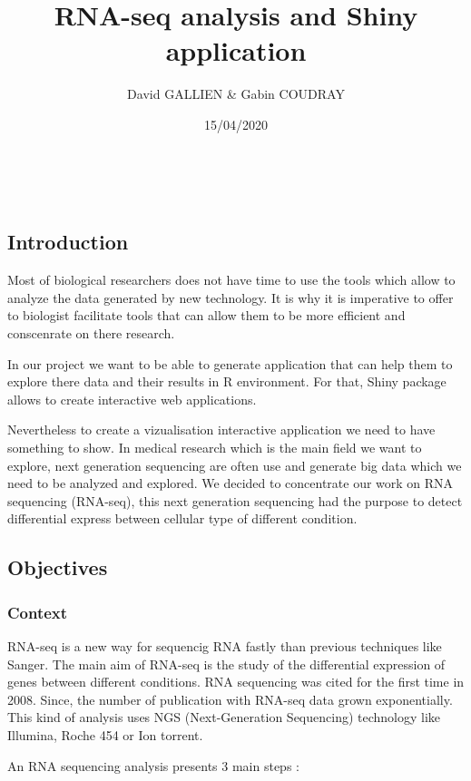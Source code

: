 \documentclass[]{article}
\title{RNA-seq analysis and Shiny application}
\author{David GALLIEN \& Gabin COUDRAY}
\date{15/04/2020}
\begin{document}
\maketitle

~

\subsection{Introduction}\label{introduction}

Most of biological researchers does not have time to use the tools which
allow to analyze the data generated by new technology. It is why it is
imperative to offer to biologist facilitate tools that can allow them to
be more efficient and conscenrate on there research.

In our project we want to be able to generate application that can help
them to explore there data and their results in R environment. For that,
Shiny package allows to create interactive web applications.

Nevertheless to create a vizualisation interactive application we need
to have something to show. In medical research which is the main field
we want to explore, next generation sequencing are often use and
generate big data which we need to be analyzed and explored. We decided
to concentrate our work on RNA sequencing (RNA-seq), this next
generation sequencing had the purpose to detect differential express
between cellular type of different condition.

\subsection{Objectives}\label{objectives}

\subsubsection{Context}\label{context}

RNA-seq is a new way for sequencig RNA fastly than previous techniques
like Sanger. The main aim of RNA-seq is the study of the differential
expression of genes between different conditions. RNA sequencing was
cited for the first time in 2008. Since, the number of publication with
RNA-seq data grown exponentially. This kind of analysis uses NGS
(Next-Generation Sequencing) technology like Illumina, Roche 454 or Ion
torrent.

An RNA sequencing analysis presents 3 main steps :
\end{document}
